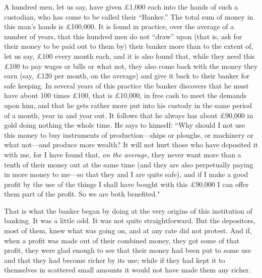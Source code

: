 \documentclass{book}
\begin{document}
A hundred men, let us say, have given £1,000 each into the hands of such a custodian, who has come to be called their “Banker.” The total sum of money in this man’s hands is £100,000. It is found in practice, over the average of a number of years, that this hundred men do not “draw” upon (that is, ask for their money to be paid out to them by) their banker more than to the extent of, let us say, £100 every month each, and it is also found that, while they need this £100 to pay wages or bills or what not, they also come back with the money they earn (say, £120 per month, on the average) and give it back to their banker for safe keeping. In several years of this practice the banker discovers that he must have about 100 times £100, that is £10,000, in free cash to meet the demands upon him, and that he gets rather more put into his custody in the same period of a month, year in and year out. It follows that he always has about £90,000 in gold doing nothing the whole time. He says to himself: “Why should I not use this money to buy instruments of production—ships or ploughs, or machinery or what not—and produce more wealth? It will not hurt those who have deposited it with me, for I have found that, \emph{on the average,} they never want more than a tenth of their money out at the same time (and they are also perpetually paying in more money to me—so that they and I are quite safe), and if I make a good profit by the use of the things I shall have bought with this £90,000 I can offer them part of the profit. So we are both benefited."

That is what the banker began by doing at the very origins of this institution of banking. It was a little odd. It was not quite straightforward. But the depositors, most of them, knew what was going on, and at any rate did not protest. And if, when a profit was made out of their combined money, they got some of that profit, they were glad enough to see that their money had been put to some use and that they had become richer by its use; while if they had kept it to themselves in scattered small amounts it would not have made them any richer.
\end{document}
